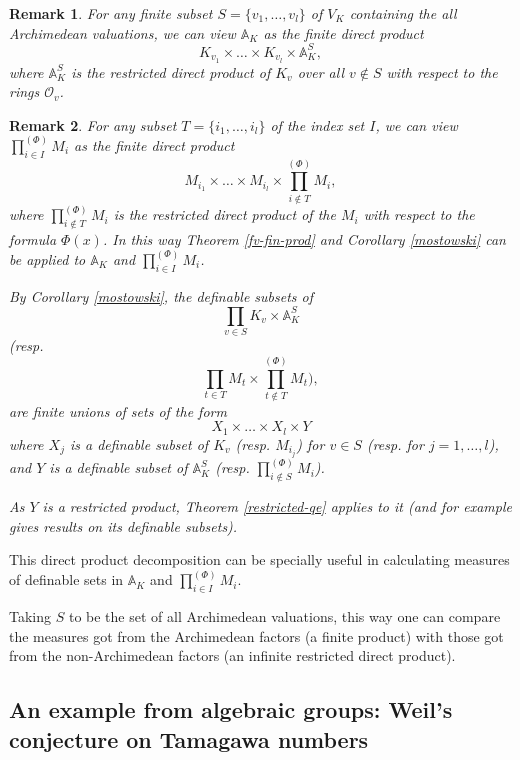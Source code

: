 \documentclass[12pt]{amsart}
\def\A{\mathbb{A}}
\def\cO{\mathcal{O}}
\newtheorem{remark}{Remark}[section]
\numberwithin{equation}{section}
\begin{document}
\begin{remark} For any finite subset $S=\{v_1,\dots,v_l\}$ of $V_K$ containing the all Archimedean valuations, we can view $\A_K$ as the finite direct product 
$$K_{v_1} \times \dots \times K_{v_l} \times \A_K^S,$$ where 
$\A_K^S$ is the restricted direct product of $K_v$ over all $v\notin S$ with respect to the rings $\cO_v$. 
\end{remark}

\begin{remark} For any subset $T=\{i_1,\dots,i_l\}$ of the index set $I$, we can view $\prod_{i\in I}^{(\Phi)} M_i$ as the finite direct product 
$$M_{i_1} \times \dots \times M_{i_l} \times \prod_{i\notin T}^{(\Phi)} M_i,$$ 
where $\prod_{i\notin T}^{(\Phi)} M_i$ is the restricted direct product of the $M_i$ with respect to the formula $\Phi(x)$. In this way Theorem \ref{fv-fin-prod} and Corollary \ref{mostowski} can be applied to $\A_K$ and $\prod_{i\in I}^{(\Phi)} M_i$. 

By Corollary 
\ref{mostowski}, the definable subsets of $$\prod_{v\in S} K_v \times \A_K^S$$ 
(resp. $$\prod_{t\in T} M_t \times \prod_{t\notin T}^{(\Phi)} M_t),$$
are finite unions of sets of the form 
$$X_1 \times \dots \times X_l \times Y$$
where $X_j$ is a definable subset of $K_{v}$ (resp. $M_{i_j}$) for $v\in S$ (resp. for $j=1,\dots,l$), and $Y$ is a definable subset of 
$\A_K^S$ (resp. $\prod_{i\notin S}^{(\Phi)} M_i$). 

As $Y$ is a restricted product, Theorem \ref{restricted-qe} applies to it (and for example gives results on its definable subsets).
\end{remark}

This direct product decomposition can be specially useful in calculating measures of definable sets in $\A_K$ and 
$\prod_{i\in I}^{(\Phi)} M_i$. 

Taking $S$ to be the set of all
Archimedean valuations, this way one can compare the measures got from the Archimedean factors (a finite product) with those got from the non-Archimedean factors (an infinite restricted direct product). 

\medskip

\subsection{\bf An example from algebraic groups: Weil's conjecture on Tamagawa numbers}

\
\end{document}
